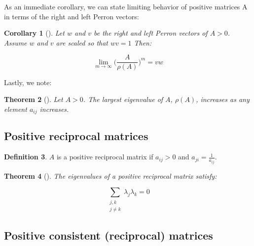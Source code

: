\documentclass[a4,11pt,twoside,leqno]{report}
\newtheorem{thm}{Theorem}[section]
\newtheorem{cor}[thm]{Corollary}
\theoremstyle{definition}
\newtheorem{defn}[thm]{Definition}
\theoremstyle{remark}
\numberwithin{equation}{section}
\begin{document}
As an immediate corollary, we can state limiting behavior of positive matrices A in terms of the right and left Perron vectors:

\begin{cor}[\cite{hornandjohnson}] Let $w$ and $v$ be the right and left Perron vectors of $A>0$. Assume $w$ and $v$ are scaled so that $wv=1$ Then:

$$\lim_{m \rightarrow \infty} \Big(\frac{A}{\rho(A)}\Big)^m=vw$$

\end{cor}

Lastly, we note:

\begin{thm}[\cite{analytic}] Let $A>0$. The largest eigenvalue of $A$, $\rho(A)$, increases as any element $a_{ij}$ increases. 
\end{thm}

\subsection{Positive reciprocal matrices}

\begin{defn} $A$ is a positive reciprocal matrix if $a_{ij}>0$ and $a_{ji}=\frac{1}{a_{ij}}$. 

\end{defn}

\begin{thm}[\cite{analytic}] The eigenvalues of a positive reciprocal matrix satisfy:

$$\displaystyle \sum_{\substack{{j,k}\\j\not=k}} \lambda_j\lambda_k=0$$

\end{thm}


\subsection{Positive consistent (reciprocal) matrices}
\end{document}
